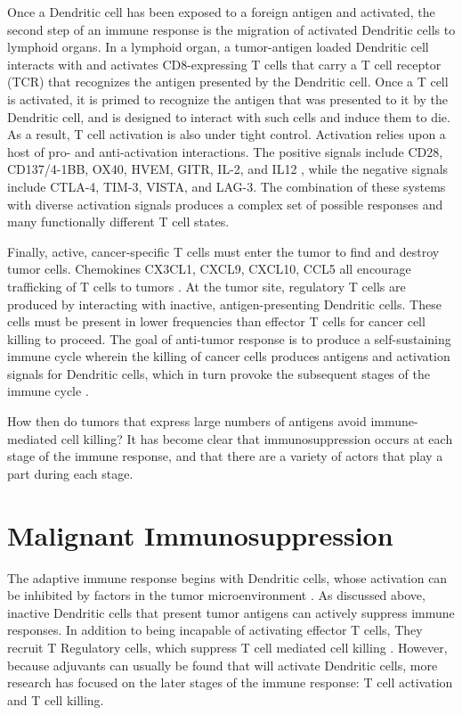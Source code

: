 Once a Dendritic cell has been exposed to a foreign antigen and activated, the second step of an immune response is the migration of activated Dendritic cells to lymphoid organs. 
In a lymphoid organ, a tumor-antigen loaded Dendritic cell interacts with and activates CD8-expressing T cells that carry a T cell receptor (TCR) that recognizes the antigen presented by the Dendritic cell. 
Once a T cell is activated, it is primed to recognize the antigen that was presented to it by the Dendritic cell, and is designed to interact with such cells and induce them to die. 
As a result, T cell activation is also under tight control. 
Activation relies upon a host of pro- and anti-activation interactions. 
The positive signals include CD28, CD137/4-1BB, OX40, HVEM, GITR, IL-2, and IL12 \citep{Franciszkiewicz2012,Lippitz2013}, while the negative signals include CTLA-4, TIM-3, VISTA, and LAG-3. %
The combination of these systems with diverse activation signals produces a complex set of possible responses and many functionally different T cell states.

Finally, active, cancer-specific T cells must enter the tumor to find and destroy tumor cells. 
Chemokines CX3CL1, CXCL9, CXCL10, CCL5 all encourage trafficking of T cells to tumors \citep{Franciszkiewicz2012}.
At the tumor site, regulatory T cells are produced by interacting with inactive, antigen-presenting Dendritic cells. 
These cells must be present in lower frequencies than effector T cells for cancer cell killing to proceed. 
The goal of anti-tumor response is to produce a self-sustaining immune cycle wherein the killing of cancer cells produces antigens and activation signals for Dendritic cells, which in turn provoke the subsequent stages of the immune cycle \citep{Chen2013}.

How then do tumors that express large numbers of antigens avoid immune-mediated cell killing? 
It has become clear that immunosuppression occurs at each stage of the immune response, and that there are a variety of actors that play a part during each stage. 

\section{Malignant Immunosuppression}

The adaptive immune response begins with Dendritic cells, whose activation can be inhibited by factors in the tumor microenvironment \citep{Michielsen2012,Chevalier2017}. 
As discussed above, inactive Dendritic cells that present tumor antigens can actively suppress immune responses. 
In addition to being incapable of activating effector T cells, They recruit T Regulatory cells, which suppress T cell mediated cell killing \citep{Ohta2006,Curiel2004}. 
However, because adjuvants can usually be found that will activate Dendritic cells, more research has focused on the later stages of the immune response: T cell activation and T cell killing. 

